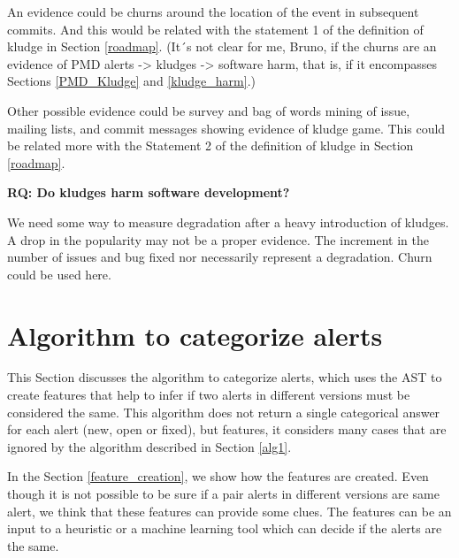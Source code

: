 \documentclass[
]{article}
\begin{document}
An evidence could be churns around the location of the event in
subsequent commits. And this would be related with the statement 1 of
the definition of kludge in Section \ref{roadmap}. (It´s not clear for
me, Bruno, if the churns are an evidence of PMD alerts -\textgreater{}
kludges -\textgreater{} software harm, that is, if it encompasses
Sections \ref{PMD_Kludge} and \ref{kludge_harm}.)

%
%

Other possible evidence could be survey and bag of words mining of
issue, mailing lists, and commit messages showing evidence of kludge
game. This could be related more with the Statement 2 of the definition
of kludge in Section \ref{roadmap}.

\vspace{32px}
\textbf{RQ: Do kludges harm software development?} \label{kludge_harm}

We need some way to measure degradation after a heavy introduction of
kludges. A drop in the popularity may not be a proper evidence. The 
increment in the number of issues and bug fixed nor necessarily
represent a degradation. Churn could be used here.


%
%

\section{Algorithm to categorize alerts}\label{alg}

This Section discusses the algorithm to categorize alerts, which uses
the AST to create features that help to infer if two alerts in different
versions must be considered the same. This algorithm does not return a
single categorical answer for each alert (new, open or fixed), but features, 
it considers many cases that are ignored by the algorithm described in 
Section \ref{alg1}.

%
%

In the Section \ref{feature_creation}, we show how the features are
created. Even though it is not possible to be sure if a pair alerts in
different versions are same alert, we think that these features can
provide some clues. The features can be an input to a heuristic or a
machine learning tool which can decide if the alerts are the same.
\end{document}
